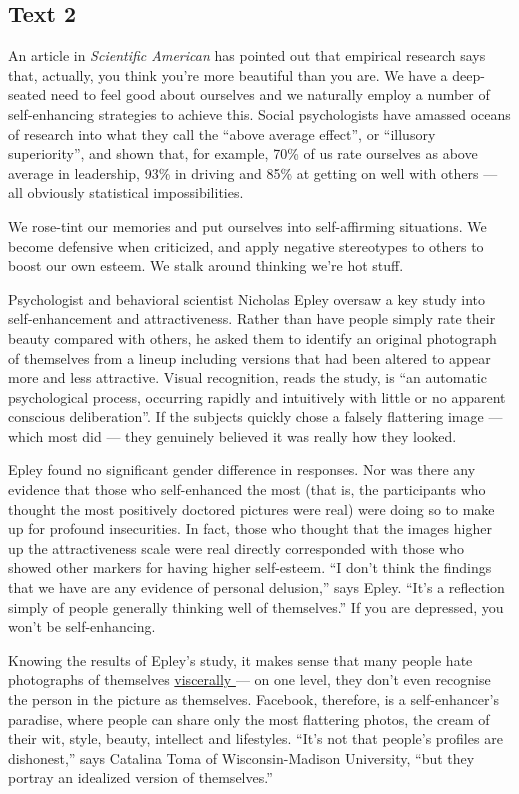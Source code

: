 \documentclass[UTF8,11pt]{ctexart}
\begin{document}
\subsection*{\textbf{Text 2}}


An article in \textit{Scientific American} has pointed out that empirical research says that, actually, you think you’re more beautiful than you are. We have a deep-seated need to feel good about ourselves and we naturally employ a number of self-enhancing strategies to achieve this. Social psychologists have amassed oceans of research into what they call the “above average effect”, or “illusory superiority”, and shown that, for example, 70\% of us rate ourselves as above average in leadership, 93\% in driving and 85\% at getting on well with others — all obviously statistical impossibilities.


We rose-tint our memories and put ourselves into self-affirming situations. We become defensive when criticized, and apply negative stereotypes to others to boost our own esteem. We stalk around thinking we’re hot stuff.


Psychologist and behavioral scientist Nicholas Epley oversaw a key study into self-enhancement and attractiveness. Rather than have people simply rate their beauty compared with others, he asked them to identify an original photograph of themselves from a lineup including versions that had been altered to appear more and less attractive. Visual recognition, reads the study, is “an automatic psychological process, occurring rapidly and intuitively with little or no apparent conscious deliberation”. If the subjects quickly chose a falsely flattering image — which most did — they genuinely believed it was really how they looked.


Epley found no significant gender difference in responses. Nor was there any evidence that those who self-enhanced the most (that is, the participants who thought the most positively doctored pictures were real) were doing so to make up for profound insecurities. In fact, those who thought that the images higher up the attractiveness scale were real directly corresponded with those who showed other markers for having higher self-esteem. “I don’t think the findings that we have are any evidence of personal delusion,” says Epley. “It’s a reflection simply of people generally thinking well of themselves.” If you are depressed, you won’t be self-enhancing.


Knowing the results of Epley’s study, it makes sense that many people hate photographs of themselves \uline{viscerally }— on one level, they don’t even recognise the person in the picture as themselves. Facebook, therefore, is a self-enhancer’s paradise, where people can share only the most flattering photos, the cream of their wit, style, beauty, intellect and lifestyles. “It’s not that people’s profiles are dishonest,” says Catalina Toma of Wisconsin-Madison University, “but they portray an idealized version of themselves.”
\end{document}
